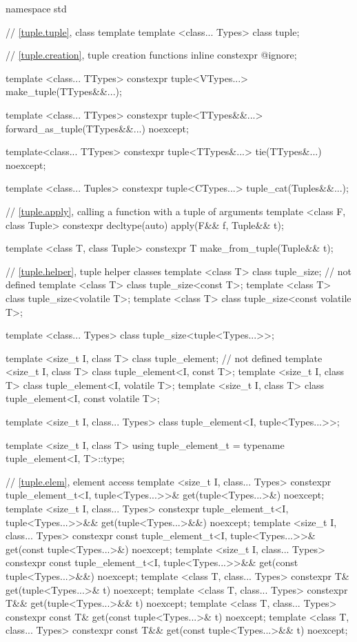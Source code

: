 %
%
\begin{codeblock}
namespace std {
  // \ref{tuple.tuple}, class template 
  template <class... Types>
    class tuple;

  // \ref{tuple.creation}, tuple creation functions
  inline constexpr @\unspec@ ignore;

  template <class... TTypes>
    constexpr tuple<VTypes...> make_tuple(TTypes&&...);

  template <class... TTypes>
    constexpr tuple<TTypes&&...> forward_as_tuple(TTypes&&...) noexcept;

  template<class... TTypes>
    constexpr tuple<TTypes&...> tie(TTypes&...) noexcept;

  template <class... Tuples>
    constexpr tuple<CTypes...> tuple_cat(Tuples&&...);

  // \ref{tuple.apply}, calling a function with a tuple of arguments
  template <class F, class Tuple>
    constexpr decltype(auto) apply(F&& f, Tuple&& t);

  template <class T, class Tuple>
    constexpr T make_from_tuple(Tuple&& t);

  // \ref{tuple.helper}, tuple helper classes
  template <class T> class tuple_size;                  // not defined
  template <class T> class tuple_size<const T>;
  template <class T> class tuple_size<volatile T>;
  template <class T> class tuple_size<const volatile T>;

  template <class... Types> class tuple_size<tuple<Types...>>;

  template <size_t I, class T> class tuple_element;     // not defined
  template <size_t I, class T> class tuple_element<I, const T>;
  template <size_t I, class T> class tuple_element<I, volatile T>;
  template <size_t I, class T> class tuple_element<I, const volatile T>;

  template <size_t I, class... Types>
    class tuple_element<I, tuple<Types...>>;

  template <size_t I, class T>
    using tuple_element_t = typename tuple_element<I, T>::type;

  // \ref{tuple.elem}, element access
  template <size_t I, class... Types>
    constexpr tuple_element_t<I, tuple<Types...>>& get(tuple<Types...>&) noexcept;
  template <size_t I, class... Types>
    constexpr tuple_element_t<I, tuple<Types...>>&& get(tuple<Types...>&&) noexcept;
  template <size_t I, class... Types>
    constexpr const tuple_element_t<I, tuple<Types...>>& get(const tuple<Types...>&) noexcept;
  template <size_t I, class... Types>
    constexpr const tuple_element_t<I, tuple<Types...>>&& get(const tuple<Types...>&&) noexcept;
  template <class T, class... Types>
    constexpr T& get(tuple<Types...>& t) noexcept;
  template <class T, class... Types>
    constexpr T&& get(tuple<Types...>&& t) noexcept;
  template <class T, class... Types>
    constexpr const T& get(const tuple<Types...>& t) noexcept;
  template <class T, class... Types>
    constexpr const T&& get(const tuple<Types...>&& t) noexcept;

}
\end{codeblock}
